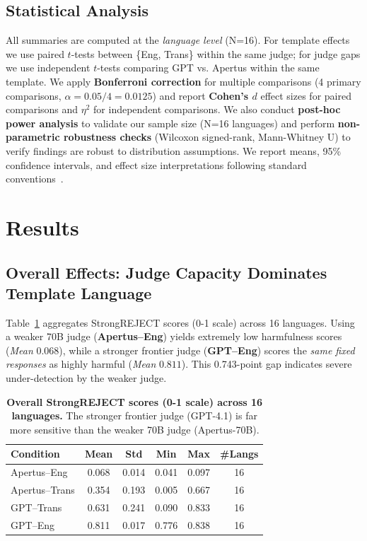 \subsection{Statistical Analysis}
All summaries are computed at the \emph{language level} (N=16). For template effects we use paired $t$-tests between \{Eng, Trans\} within the same judge; for judge gaps we use independent $t$-tests comparing GPT vs. Apertus within the same template. We apply \textbf{Bonferroni correction} for multiple comparisons (4 primary comparisons, $\alpha = 0.05/4 = 0.0125$) and report \textbf{Cohen's $d$} effect sizes for paired comparisons and $\eta^2$ for independent comparisons. We also conduct \textbf{post-hoc power analysis} to validate our sample size (N=16 languages) and perform \textbf{non-parametric robustness checks} (Wilcoxon signed-rank, Mann-Whitney U) to verify findings are robust to distribution assumptions. We report means, 95\% confidence intervals, and effect size interpretations following standard conventions~\citep{cohen1988statistical}.


\section{Results}
\label{sec:results}

\subsection{Overall Effects: Judge Capacity Dominates Template Language}
Table~\ref{tab:overall} aggregates StrongREJECT scores (0-1 scale) across 16 languages. Using a weaker 70B judge (\textbf{Apertus--Eng}) yields extremely low harmfulness scores (\emph{Mean} $0.068$), while a stronger frontier judge (\textbf{GPT--Eng}) scores the \emph{same fixed responses} as highly harmful (\emph{Mean} $0.811$). This 0.743-point gap indicates severe under-detection by the weaker judge.

\begin{table}[ht]
\centering
\small
\setlength{\tabcolsep}{6pt}
\begin{tabular}{lccccc}
\toprule
\textbf{Condition} & \textbf{Mean} & \textbf{Std} & \textbf{Min} & \textbf{Max} & \textbf{\#Langs} \\
\midrule
Apertus--Eng   & 0.068 & 0.014 & 0.041 & 0.097 & 16 \\
Apertus--Trans & 0.354 & 0.193 & 0.005 & 0.667 & 16 \\
GPT--Trans     & 0.631 & 0.241 & 0.090 & 0.833 & 16 \\
GPT--Eng       & 0.811 & 0.017 & 0.776 & 0.838 & 16 \\
\bottomrule
\end{tabular}
\caption{\textbf{Overall StrongREJECT scores (0-1 scale) across 16 languages.} The stronger frontier judge (GPT-4.1) is far more sensitive than the weaker 70B judge (Apertus-70B).}
\label{tab:overall}
\end{table}

